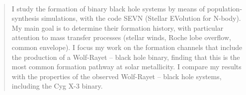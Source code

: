 \documentclass[a4paper,titlepage]{book}     	%
\newenvironment{abstract}{\newpage \thispagestyle{empty} \vspace*{3\baselineskip}
	\begin{center}\Large\textbf\abstractname\end{center}
	\begin{quotation}
	}{\end{quotation}\clearpage}
\begin{document}
\frontmatter

\begin{frontespizio}
	\Preambolo{\renewcommand{\frontinstitutionfont}{\fontsize{15}{12}\bfseries}}
	\Preambolo{\renewcommand{\frontdivisionfont}{\fontsize{16}{30}\selectfont}}
	\Preambolo{\renewcommand{\frontpretitlefont}{\fontsize{16}{20}\scshape}}
	\Preambolo{\renewcommand{\fronttitlefont}{\fontsize{19}{35}\bfseries}}
	\Preambolo{\renewcommand{\frontnamesfont}{\fontsize{15}{20}\bfseries}}
	\Preambolo{\renewcommand{\frontfixednamesfont}{\fontsize{13}{20}\selectfont}}

	\Rientro{2cm}
\end{frontespizio}	

\

\begin{abstract}%
I study the formation of binary black hole systems by means of population-synthesis simulations, with the code SEVN (Stellar EVolution for N-body). My main goal is to determine their formation history, with particular attention to mass transfer processes (stellar winds, Roche lobe overflow, common envelope). I focus my work on the formation channels that include the production of a Wolf-Rayet -- black hole binary, finding that this is the most common formation pathway at solar metallicity. I compare my results with the properties of the observed Wolf-Rayet -- black hole systems, including the Cyg X-3 binary.
\end{abstract}

\tableofcontents
{}

\mainmatter

\end{document}
